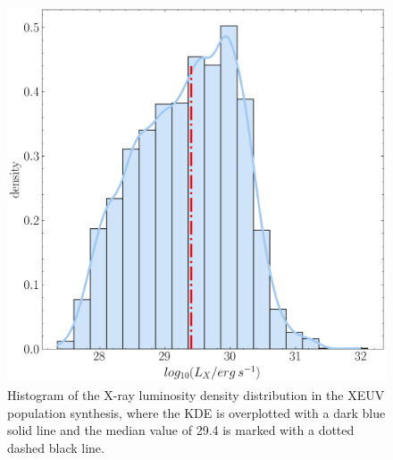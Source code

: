 \documentclass[fleqn,usenatbib,letters]{mnras}
\begin{document}
\begin{figure}
    \includegraphics[width=\columnwidth]{Fig3}
    \caption{Histogram of the X-ray luminosity density distribution in the XEUV population synthesis, where the KDE is overplotted with a dark blue solid line and the median value of 29.4 is marked with a dotted dashed black line. \label{fig:Lx}}
\end{figure}
\end{document}
